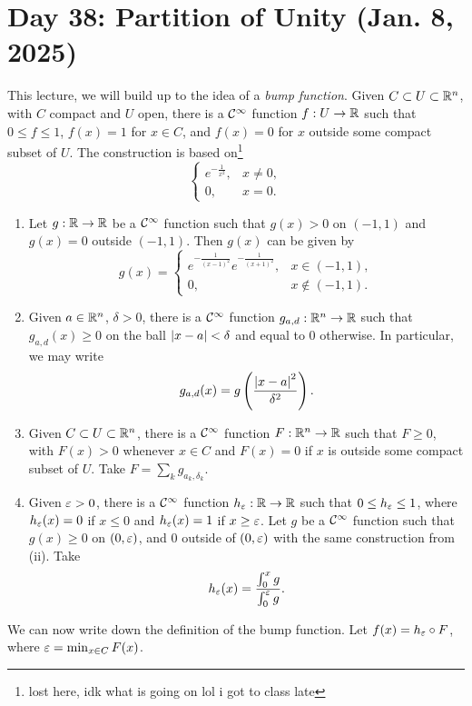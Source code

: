 \section{Day 38: Partition of Unity (Jan. 8, 2025)}
This lecture, we will build up to the idea of a \textit{bump function}. Given $C \subset U \subset \mathbb R^n$, with $C$ compact and $U$ open, there is a $\mathcal C^\infty$ function $f : U \to \mathbb R$ such that $0 \leq f \leq 1$, $f(x) = 1$ for $x \in C$, and $f(x) = 0$ for $x$ outside some compact subset of $U$. The construction is based on\footnote{lost here, idk what is going on lol i got to class late}
\[ \begin{cases} e^{-\frac{1}{x^2}} , &x \neq 0, \\ 0, &x = 0. \end{cases} \]
\begin{enumerate}[label=(\roman*)]
    \item Let $g : \mathbb R \to \mathbb R$ be a $\mathcal C^\infty$ function such that $g(x) > 0$ on $(-1, 1)$ and $g(x) = 0$ outside $(-1, 1)$. Then $g(x)$ can be given by
    \[ g(x) = \begin{cases} e^{-\frac{1}{(x-1)^2}} e^{-\frac{1}{(x+1)^2}}, &x \in (-1, 1), \\ 0, &x \not\in (-1, 1). \end{cases} \]
    \item Given $a \in \mathbb R^n$, $\delta > 0$, there is a $\mathcal C^\infty$ function $g_{a,d} : \mathbb R^n \to \mathbb R$  such that $g_{a,d}(x) \geq 0$ on the ball $\left\lvert x - a \right\rvert < \delta$ and equal to $0$ otherwise. In particular, we may write
    \[ g_{a,d}(x) = g\left(\frac{\left\lvert x - a \right\rvert^2}{\delta^2}\right). \]
    \item Given $C \subset U \subset \mathbb R^n$, there is a $\mathcal C^\infty$ function $F : \mathbb R^n \to \mathbb R$ such that $F \geq 0$, with $F(x) > 0$ whenever $x \in C$ and $F(x) = 0$ if $x$ is outside some compact subset of $U$. Take $F = \sum_{k} g_{a_k, \delta_k}$.
    \item Given $\varepsilon > 0$, there is a $\mathcal C^\infty$ function $h_\varepsilon : \mathbb R \to \mathbb R$ such that $0 \leq h_\varepsilon \leq 1$, where $h_\varepsilon(x) = 0$ if $x \leq 0$ and $h_\varepsilon(x) = 1$ if $x \geq \varepsilon$. Let $g$ be a $\mathcal C^\infty$ function such that $g(x) \geq 0$ on $(0, \varepsilon)$, and $0$ outside of $(0, \varepsilon)$ with the same construction from (ii). Take
    \[ h_\varepsilon(x) = \dfrac{\int_0^x g}{\int_0^\varepsilon g}. \]
\end{enumerate}
We can now write down the definition of the bump function. Let $f(x) = h_\varepsilon \circ F$, where $\varepsilon = \min_{x \in C} F(x)$.
